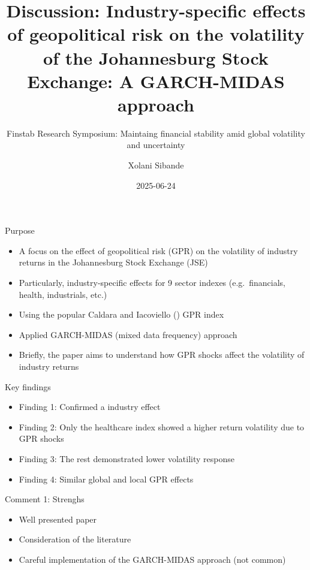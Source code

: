 \documentclass[
  12pt,
  ignorenonframetext,
]{beamer}
\title{Discussion: Industry-specific effects of geopolitical risk on the
volatility of the Johannesburg Stock Exchange: A GARCH-MIDAS approach}
\subtitle{Finstab Research Symposium: Maintaing financial stability amid
global volatility and uncertainty}
\author{Xolani Sibande}
\date{2025-06-24}
\institute{South African Reserve Bank}
\providecommand{\tightlist}{%
  \setlength{\itemsep}{0pt}\setlength{\parskip}{0pt}}
\begin{document}
\frame{\titlepage}


\begin{frame}[s]{Purpose}
\label{purpose}

\begin{itemize}
\tightlist
\item
  A focus on the effect of geopolitical risk (GPR) on the volatility of
  industry returns in the Johannesburg Stock Exchange (JSE)
\item
  Particularly, industry-specific effects for 9 sector indexes
  (e.g.~financials, health, industrials, etc.)
\item
  Using the popular Caldara and Iacoviello
  () GPR index
\item
  Applied GARCH-MIDAS (mixed data frequency) approach
\item
  Briefly, the paper aims to understand how GPR shocks affect the
  volatility of industry returns
\end{itemize}
\end{frame}

\begin{frame}[s]{Key findings}
\label{key-findings}

\begin{itemize}
\tightlist
\item
  Finding 1: Confirmed a industry effect
\item
  Finding 2: Only the healthcare index showed a higher return volatility
  due to GPR shocks
\item
  Finding 3: The rest demonstrated lower volatility response
\item
  Finding 4: Similar global and local GPR effects
\end{itemize}
\end{frame}

\begin{frame}[s]{Comment 1: Strenghs}
\label{comment-1-strenghs}

\begin{itemize}
\tightlist
\item
  Well presented paper
\item
  Consideration of the literature
\item
  Careful implementation of the GARCH-MIDAS approach (not common)
\end{itemize}
\end{frame}
\end{document}

